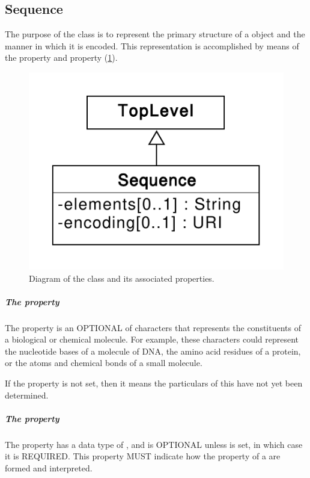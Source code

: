 \subsection{Sequence}
\label{sec:Sequence}
The purpose of the  class is to represent the primary structure of a  object and the manner in which it is encoded. This representation is accomplished  by means of the  property and  property (\ref{uml:sequence}).

\begin{figure}[ht]
\begin{center}
\includegraphics[scale=0.6]{uml/sequence}
\caption[]{Diagram of the  class and its associated properties.}
\label{uml:sequence}
\end{center}
\end{figure}


\subparagraph{The  property}
\label{sec:elements}
The  property is an OPTIONAL  of characters that represents the constituents of a biological or chemical molecule. 
For example, these characters could represent the nucleotide bases of a molecule of DNA, the amino acid residues of a protein, or the atoms and chemical bonds of a small molecule.

If the  property is not set, then it means the particulars of this  have not yet been determined.

\subparagraph{The  property}
\label{sec:encoding}
The  property has a data type of , and is OPTIONAL unless  is set, in which case it is REQUIRED.
This property MUST indicate how the  property of a  are formed and interpreted.

